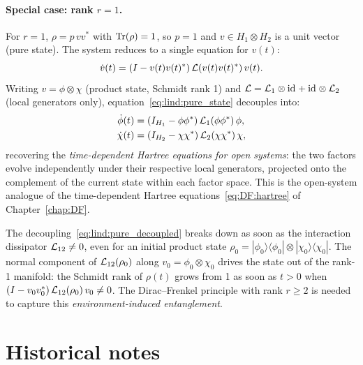 \paragraph{Special case: rank $r=1$.}
For $r=1$, $\rho = p\, v v^*$ with $\mathrm{Tr}(\rho) = 1$, so $p = 1$ and
$v \in H_1 \otimes H_2$ is a unit vector (pure state). The system
reduces to a single equation for $v(t)$:
\begin{equation}
\label{eq:lind:pure_state}
    \dot{v}(t)
    = (I - v(t)v(t)^*)\, \mathcal{L}(v(t)v(t)^*)\, v(t).
\end{equation}
Writing $v = \phi \otimes \chi$ (product state, Schmidt rank 1) and
$\mathcal{L} = \mathcal{L}_1 \otimes \mathrm{id}_{} + \mathrm{id}_{} \otimes \mathcal{L}_2$ (local generators only),
equation~\eqref{eq:lind:pure_state} decouples into:
\begin{subequations}
\label{eq:lind:pure_decoupled}
\begin{align}
    \dot\phi(t) &= (I_{H_1} - \phi\phi^*)\,\mathcal{L}_1(\phi\phi^*)\,\phi, \\
    \dot\chi(t) &= (I_{H_2} - \chi\chi^*)\,\mathcal{L}_2(\chi\chi^*)\,\chi,
\end{align}
\end{subequations}
recovering the \emph{time-dependent Hartree equations for open systems}:
the two factors evolve independently under their respective local
generators, projected onto the complement of the current state within
each factor space. This is the open-system analogue of the time-dependent
Hartree equations~\eqref{eq:DF:hartree} of Chapter~\ref{chap:DF}.

\begin{remark}
\label{rem:lind:entanglement_gen}
The decoupling~\eqref{eq:lind:pure_decoupled} breaks down as soon
as the interaction dissipator $\mathcal{L}_{12} \neq 0$, even for an
initial product state $\rho_0 = |\phi_0\rangle\langle\phi_0| \otimes
|\chi_0\rangle\langle\chi_0|$. The normal component of
$\mathcal{L}_{12}(\rho_0)$ along $v_0 = \phi_0 \otimes \chi_0$ drives
the state out of the rank-1 manifold: the Schmidt rank of $\rho(t)$
grows from 1 as soon as $t > 0$ when
$(I - v_0 v_0^*)\,\mathcal{L}_{12}(\rho_0)\,v_0 \neq 0$. The Dirac--Frenkel
principle with rank $r \geq 2$ is needed to capture this
\emph{environment-induced entanglement}.
\end{remark}

\section{Historical notes}
\label{sec:lind:history}

